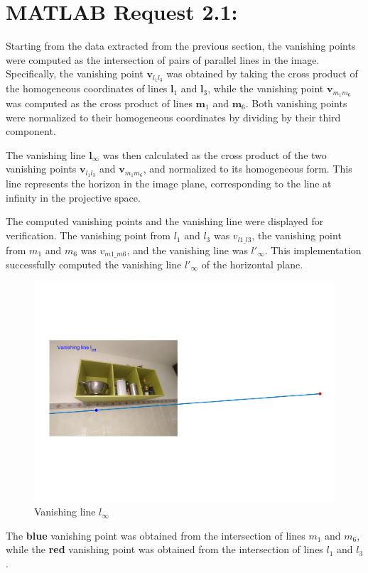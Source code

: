 \documentclass{Configuration_Files/PoliMi3i_thesis}
\begin{document}
\newpage
\section{MATLAB Request 2.1: }
Starting from the data extracted from the previous section, the vanishing points were computed as the intersection of pairs of parallel lines in the image. Specifically, the vanishing point $\mathbf{v}_{l_1l_3}$ was obtained by taking the cross product of the homogeneous coordinates of lines $\mathbf{l}_1$ and $\mathbf{l}_3$, while the vanishing point $\mathbf{v}_{m_1m_6}$ was computed as the cross product of lines $\mathbf{m}_1$ and $\mathbf{m}_6$. Both vanishing points were normalized to their homogeneous coordinates by dividing by their third component. 

The vanishing line $\mathbf{l}_{\infty}$ was then calculated as the cross product of the two vanishing points $\mathbf{v}_{l_1l_3}$ and $\mathbf{v}_{m_1m_6}$, and normalized to its homogeneous form. This line represents the horizon in the image plane, corresponding to the line at infinity in the projective space.

The computed vanishing points and the vanishing line were displayed for verification. The vanishing point from \( l_1 \) and \( l_3 \) was \( v_{l1\_l3} \), the vanishing point from \( m_1 \) and \( m_6 \) was \( v_{m1\_m6} \), and the vanishing line was \( l'_{\infty} \). 
This implementation successfully computed the vanishing line \( l'_{\infty} \) of the horizontal plane.
\begin{figure}[H]
    \centering
    \includegraphics[width=0.78\linewidth]{Project Template/Images/vanishinglinepts.png}
    \caption{Vanishing line $l_{\infty}$}
    \label{fig:enter-label}
\end{figure}
The \textbf{blue} vanishing point was obtained from the intersection of lines \( m_1 \) and \( m_6 \), while the \textbf{red} vanishing point was obtained from the intersection of lines \( l_1 \) and \( l_3 \).\\
\end{document}
